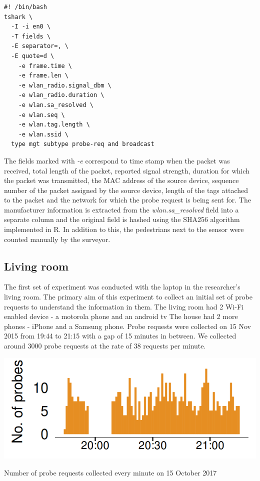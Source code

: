 \begin{verbatim}
#! /bin/bash
tshark \
  -I -i en0 \
  -T fields \
  -E separator=, \
  -E quote=d \
    -e frame.time \
    -e frame.len \
    -e wlan_radio.signal_dbm \
    -e wlan_radio.duration \
    -e wlan.sa_resolved \
    -e wlan.seq \
    -e wlan.tag.length \
    -e wlan.ssid \
  type mgt subtype probe-req and broadcast
\end{verbatim}

The fields marked with \textit{-e} correspond to time stamp when the packet was received, total length of the packet, reported signal strength, duration for which the packet was transmitted, the MAC address of the source device, sequence number of the packet assigned by the source device, length of the tags attached to the packet and the network for which the probe request is being sent for.
The manufacturer information is extracted from the \textit{wlan.sa\_resolved} field into a separate column and the original field is hashed using the SHA256 algorithm implemented in R.
In addition to this, the pedestrians next to the sensor were counted manually by the surveyor.

\subsection{Living room}
The first set of experiment was conducted with the laptop in the researcher's living room.
The primary aim of this experiment to collect an initial set of probe requests to understand the information in them.
The living room had 2 Wi-Fi enabled device - a motorola phone and an android tv 
The house had 2 more phones - iPhone and a Samsung phone.
Probe requests were collected on 15 Nov 2015 from 19:44 to 21:15 with a gap of 15 minutes in between.
We collected around 3000 probe requests at the rate of 38 requests per minute.

\begin{marginfigure}
  \includegraphics{images/home-total-count.png}
  \caption{Number of probe requests collected every minute on 15 October 2017}
  \label{figure:collection:home:total}
\end{marginfigure}

